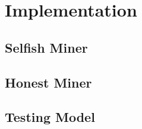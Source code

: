 \chapter{Implementation}
\label{sec:implementation}
\minitoc
\vspace*{1cm}

\section{Selfish Miner}

\section{Honest Miner}

\section{Testing Model}